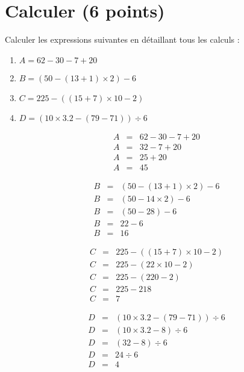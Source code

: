 \section{Calculer (6 points)}


\begin{questions}
	\question[4] Calculer les expressions suivantes en détaillant tous les calculs :
	
	\begin{enumerate}
		\item $A = 62 - 30 - 7 + 20$
		
		\item $B = (50 - (13 + 1) \times 2) - 6$
		
		\item $C= 225 - ((15 + 7) \times 10 - 2)$
		
		\item $D= (10 \times \num{3.2} - (79 - 71)) \div 6$
	\end{enumerate}


	\begin{solution}
		
		\begin{multicols}{2}
			
		\begin{eqnarray*}
			A &=& 62 - 30 - 7 + 20 \\
			A &=& 32 - 7 + 20 \\
			A &=& 25 + 20 \\
			A &=& 45
		\end{eqnarray*}
		
		\begin{eqnarray*}
			B &=& (50 - (13 + 1) \times 2) - 6 \\
			B &=& (50 - 14 \times 2) - 6  \\
			B &=& (50 - 28) - 6  \\
			B &=& 22 - 6  \\
			B &=& 16
		\end{eqnarray*}
		
		\begin{eqnarray*}
			C &=& 225 - ((15 + 7) \times 10 - 2)\\
			C &=& 225 - (22 \times 10 - 2) \\
			C &=& 225 - (220 - 2) \\
			C &=& 225 - 218  \\
			C &=& 7
		\end{eqnarray*}
		
		\begin{eqnarray*}
			D &=& (10 \times \num{3.2} - (79 - 71)) \div 6\\
			D &=& (10 \times \num{3.2} - 8) \div 6 \\
			D &=& (32 - 8) \div 6 \\
			D &=& 24 \div 6  \\
			D &=& 4
		\end{eqnarray*}
		\end{multicols}
	\end{solution}


\end{questions}
